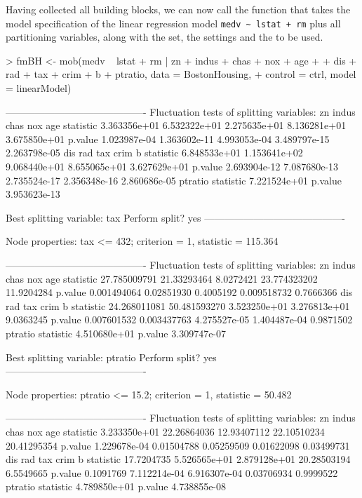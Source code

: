 \documentclass{Z}
\begin{document}
Having collected all building blocks, we can now call the function 
that takes the model specification of the linear regression model \verb:medv ~ lstat + rm:
plus all partitioning variables, along with the  set, the 
settings and the  to be used.

\begin{Schunk}
\begin{Sinput}
> fmBH <- mob(medv ~ lstat + rm | zn + indus + chas + nox + age + 
+     dis + rad + tax + crim + b + ptratio, data = BostonHousing, 
+     control = ctrl, model = linearModel)
\end{Sinput}
\begin{Soutput}
-------------------------------------------
Fluctuation tests of splitting variables:
                    zn        indus         chas          nox          age
statistic 3.363356e+01 6.532322e+01 2.275635e+01 8.136281e+01 3.675850e+01
p.value   1.023987e-04 1.363602e-11 4.993053e-04 3.489797e-15 2.263798e-05
                   dis          rad          tax         crim            b
statistic 6.848533e+01 1.153641e+02 9.068440e+01 8.655065e+01 3.627629e+01
p.value   2.693904e-12 7.087680e-13 2.735524e-17 2.356348e-16 2.860686e-05
               ptratio
statistic 7.221524e+01
p.value   3.953623e-13

Best splitting variable: tax
Perform split? yes
-------------------------------------------

Node properties:
tax <= 432; criterion = 1, statistic = 115.364

-------------------------------------------
Fluctuation tests of splitting variables:
                    zn       indus      chas          nox        age
statistic 27.785009791 21.33293464 8.0272421 23.774323202 11.9204284
p.value    0.001494064  0.02851930 0.4005192  0.009518732  0.7666366
                   dis          rad          tax         crim         b
statistic 24.268011081 50.481593270 3.523250e+01 3.276813e+01 9.0363245
p.value    0.007601532  0.003437763 4.275527e-05 1.404487e-04 0.9871502
               ptratio
statistic 4.510680e+01
p.value   3.309747e-07

Best splitting variable: ptratio
Perform split? yes
-------------------------------------------

Node properties:
ptratio <= 15.2; criterion = 1, statistic = 50.482

-------------------------------------------
Fluctuation tests of splitting variables:
                    zn       indus        chas         nox         age
statistic 3.233350e+01 22.26864036 12.93407112 22.10510234 20.41295354
p.value   1.229678e-04  0.01504788  0.05259509  0.01622098  0.03499731
                 dis          rad          tax        crim         b
statistic 17.7204735 5.526565e+01 2.879128e+01 20.28503194 6.5549665
p.value    0.1091769 7.112214e-04 6.916307e-04  0.03706934 0.9999522
               ptratio
statistic 4.789850e+01
p.value   4.738855e-08


\end{Soutput}
\end{Schunk}
\end{document}

